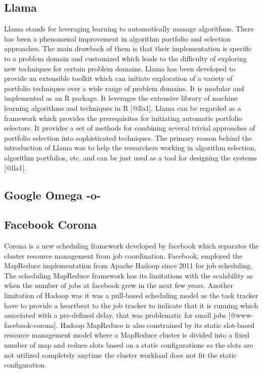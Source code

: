       
\subsection{Llama}

Llama stands for leveraging learning to automatically manage
algorithms. There has been a phenomenal improvement in algorithm
portfolio and selection approaches. The main drawback of them is that
their implementation is specific to a problem domain and customized
which leads to the difficulty of exploring new techniques for certain
problem domains. Llama has been developed to provide an extensible
toolkit which can initiate exploration of a variety of portfolio
techniques over a wide range of problem domains. It is modular and
implemented as an R package. It leverages the extensive library of
machine learning algorithms and techniques in R [@lla1]. Llama can
be regarded as a framework which provides the prerequisites for
initiating automatic portfolio selectors. It provides a set of methods
for combining several trivial approaches of portfolio selection into
sophisticated techniques. The primary reason behind the introduction
of Llama was to help the researchers working in algorithm selection,
algorithm portfolios, etc. and can be just used as a tool for
designing the systems [@lla1].
     
\subsection{Google Omega -o-}



\subsection{Facebook Corona}

Corona is a new scheduling framework developed by facebook which
separates the cluster resource management from job coordination.
Facebook, employed the MapReduce implementation from Apache Hadoop
since 2011 for job scheduling. The scheduling MapReduce framework has
its limitations with the scalability as when the number of jobs at
facebook grew in the next few years. Another limitation of Hadoop was
it was a pull-based scheduling model as the task tracker have to
provide a heartbeat to the job tracker to indicate that it is running
which associated with a pre-defined delay, that was problematic for
small jobs [@www-facebook-corona]. Hadoop MapReduce is also
constrained by its static slot-based resource management model where a
MapReduce cluster is divided into a fixed number of map and reduce
slots based on a static configurations so the slots are not utilized
completely anytime the cluster workload does not fit the static
configuration.

